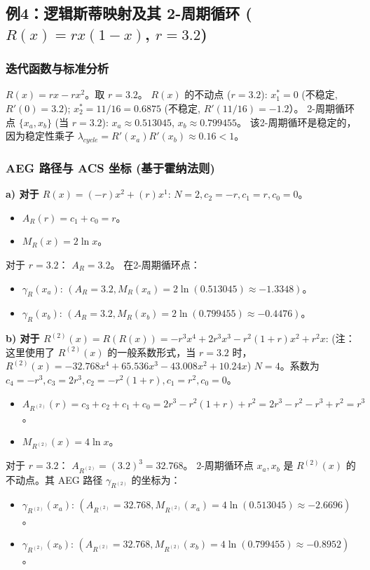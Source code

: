 \documentclass[12pt]{article}
\begin{document}
\subsection{例4：逻辑斯蒂映射及其 2-周期循环 ($R(x) = rx(1-x)$, $r=3.2$)}
\subsubsection{迭代函数与标准分析}
$R(x) = rx - rx^2$。取 $r=3.2$。
$R(x)$ 的不动点 ($r=3.2$): $x_1^* = 0$ (不稳定, $R'(0)=3.2$); $x_2^* = 11/16 = 0.6875$ (不稳定, $R'(11/16)=-1.2$）。
2-周期循环点 $\{x_a, x_b\}$ (当 $r=3.2$): $x_a \approx 0.513045$, $x_b \approx 0.799455$。
该2-周期循环是稳定的，因为稳定性乘子 $\lambda_{cycle} = R'(x_a)R'(x_b) \approx 0.16 < 1$。

\subsubsection{AEG 路径与 ACS 坐标 (基于霍纳法则)}
\textbf{a) 对于 $R(x) = (-r)x^2 + (r)x^1$}:
$N=2, c_2=-r, c_1=r, c_0=0$。
\begin{itemize}
    \item $A_R(r) = c_1 + c_0 = r$。
    \item $M_R(x) = 2 \ln x$。
\end{itemize}
对于 $r=3.2$：
$A_R = 3.2$。
在2-周期循环点：
\begin{itemize}
    \item $\gamma_R(x_a)$: $(A_R = 3.2, M_R(x_a) = 2 \ln(0.513045) \approx -1.3348)$。
    \item $\gamma_R(x_b)$: $(A_R = 3.2, M_R(x_b) = 2 \ln(0.799455) \approx -0.4476)$。
\end{itemize}

\textbf{b) 对于 $R^{(2)}(x) = R(R(x)) = -r^3 x^4 + 2r^3 x^3 - r^2(1+r) x^2 + r^2 x$}:
(注：这里使用了 $R^{(2)}(x)$ 的一般系数形式，当 $r=3.2$ 时，$R^{(2)}(x) = -32.768x^4 + 65.536x^3 - 43.008x^2 + 10.24x$)
$N=4$。系数为 $c_4=-r^3, c_3=2r^3, c_2=-r^2(1+r), c_1=r^2, c_0=0$。
\begin{itemize}
    \item $A_{R^{(2)}}(r) = c_3 + c_2 + c_1 + c_0 = 2r^3 - r^2(1+r) + r^2 = 2r^3 - r^2 - r^3 + r^2 = r^3$。
    \item $M_{R^{(2)}}(x) = 4 \ln x$。
\end{itemize}
对于 $r=3.2$：
$A_{R^{(2)}} = (3.2)^3 = 32.768$。
2-周期循环点 $x_a, x_b$ 是 $R^{(2)}(x)$ 的不动点。其 AEG 路径 $\gamma_{R^{(2)}}$ 的坐标为：
\begin{itemize}
    \item $\gamma_{R^{(2)}}(x_a)$: $(A_{R^{(2)}} = 32.768, M_{R^{(2)}}(x_a) = 4 \ln(0.513045) \approx -2.6696)$。
    \item $\gamma_{R^{(2)}}(x_b)$: $(A_{R^{(2)}} = 32.768, M_{R^{(2)}}(x_b) = 4 \ln(0.799455) \approx -0.8952)$。
\end{itemize}
\end{document}
